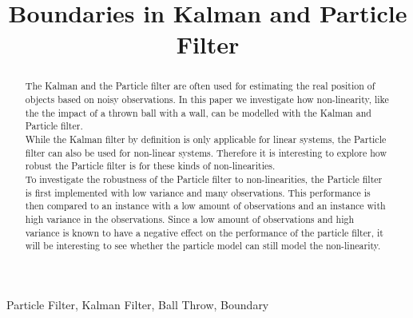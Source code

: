 \documentclass[conference]{IEEEtran}
\begin{document}
\title{Boundaries in Kalman and Particle Filter}

\author{
}
\maketitle

\begin{abstract}
The Kalman and the Particle filter are often used for estimating the real position of objects based on noisy observations.
In this paper we investigate how non-linearity, like the the impact of a thrown ball with a wall, can be modelled with the Kalman and Particle filter. \\
While the Kalman filter by definition is only applicable for linear systems, the Particle filter can also be used for non-linear systems.
Therefore it is interesting to explore how robust the Particle filter is for these kinds of non-linearities. \\
To investigate the robustness of the Particle filter to non-linearities, the Particle filter is first implemented with low variance and many observations.
This performance is then compared to an instance with a low amount of observations and an instance with high variance in the observations.
Since a low amount of observations and high variance is known to have a negative effect on the performance of the particle filter, it will be interesting to see whether the particle model can still model the non-linearity.
\end{abstract}

\begin{IEEEkeywords}
Particle Filter, Kalman Filter, Ball Throw, Boundary
\end{IEEEkeywords}
\end{document}
